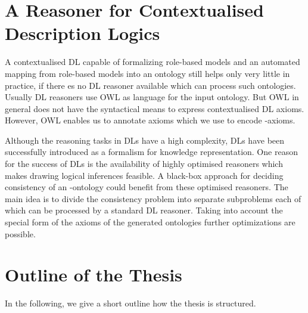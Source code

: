 \section{A Reasoner for Contextualised Description Logics}
\label{sec:intro-reasoner}

A contextualised DL capable of formalizing role-based models and an automated mapping from
role-based models into an ontology still helps only very little in practice, if there es no DL reasoner
available which can process such ontologies. 
%
Usually DL reasoners use OWL as language for the input ontology. But OWL in general does not
have the syntactical means to express contextualised DL axioms. However, OWL enables us to annotate
axioms which we use to encode \LMLO-axioms.

Although the reasoning tasks in DLs have a high complexity, DLs have been successfully introduced as
a formalism for knowledge representation. One reason for the success of DLs is the availability of
highly optimised reasoners which makes drawing logical inferences feasible. A black-box approach for
deciding consistency of an \LMLO-ontology could benefit from these optimised reasoners. The main
idea is to divide the consistency problem into separate subproblems each of which can be processed
by a standard DL reasoner.
%
Taking into account the special form of the axioms of the generated ontologies further optimizations
are possible.



\section{Outline of the Thesis}
\label{sec:outline-thesis}

In the following, we give a short outline how the thesis is structured.

